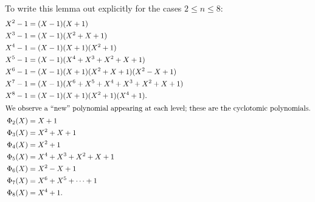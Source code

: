 \documentclass[11pt]{scrartcl}
\begin{document}
\begin{example}
  \small
  To write this lemma out explicitly for the cases $2 \le n \le 8$:
  \begin{align*}
    X^2-1 &= (X-1)(X+1) \\
    X^3-1 &= (X-1)(X^2+X+1) \\
    X^4-1 &= (X-1)(X+1)(X^2+1) \\
    X^5-1 &= (X-1)(X^4+X^3+X^2+X+1) \\
    X^6-1 &= (X-1)(X+1)(X^2+X+1)(X^2-X+1) \\
    X^7-1 &= (X-1)(X^6+X^5+X^4+X^3+X^2+X+1) \\
    X^8-1 &= (X-1)(X+1)(X^2+1)(X^4+1).  \\
  \intertext{We observe a ``new'' polynomial appearing at each level;
  these are the cyclotomic polynomials.}
    \Phi_2(X) &= X+1\\
    \Phi_3(X) &= X^2+X+1 \\
    \Phi_4(X) &= X^2+1 \\
    \Phi_5(X) &= X^4+X^3+X^2+X+1 \\
    \Phi_6(X) &= X^2-X+1 \\
    \Phi_7(X) &= X^6+X^5+\dots+1\\
    \Phi_8(X) &= X^4+1.
  \end{align*}
\end{example}
\end{document}

